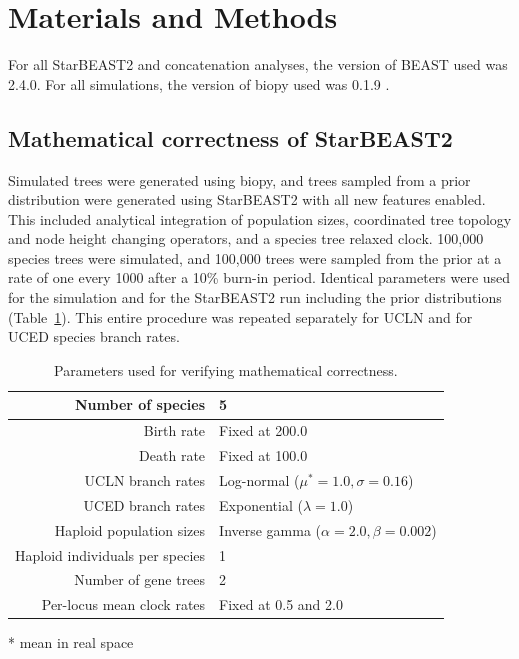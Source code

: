 \documentclass[12pt]{article}
\begin{document}
\section*{Materials and Methods}

For all StarBEAST2 and concatenation analyses, the version of BEAST used was
2.4.0. For all simulations, the version of biopy used was 0.1.9 \citep{biopy}.

\subsection*{Mathematical correctness of StarBEAST2}

Simulated trees were generated using biopy, and trees sampled from a prior
distribution were generated using StarBEAST2 with all new features enabled. This
included analytical integration of population sizes, coordinated tree topology
and node height changing operators, and a species tree relaxed clock. 100,000
species trees were simulated, and 100,000 trees were sampled from the prior at a
rate of one every 1000 after a 10\% burn-in period. Identical parameters were
used for the simulation and for the StarBEAST2 run including the prior
distributions (Table~\ref{tab:correctParameters}). This entire procedure was
repeated separately for UCLN and for UCED species branch rates.

\begin{table}[htb!]
\centering
\caption{Parameters used for verifying mathematical correctness.}
\label{tab:correctParameters}
\begin{threeparttable}
\begin{adjustbox}{center}
\begin{tabular}{|r|l|}
\hline
Number of species & 5\tabularnewline
\hline
Birth rate & Fixed at 200.0\tabularnewline
\hline
Death rate & Fixed at 100.0\tabularnewline
\hline
UCLN branch rates & Log-normal ($\mu^* = 1.0, \sigma = 0.16$)\tabularnewline
\hline
UCED branch rates & Exponential ($\lambda = 1.0$)\tabularnewline
\hline
Haploid population sizes & Inverse gamma ($\alpha = 2.0, \beta = 0.002$)\tabularnewline
\hline
Haploid individuals per species & 1\tabularnewline
\hline
Number of gene trees & 2\tabularnewline
\hline
Per-locus mean clock rates & Fixed at 0.5 and 2.0\tabularnewline
\hline
\end{tabular}
\end{adjustbox}
\begin{tablenotes}
\small
\item \hspace{2cm} * mean in real space
\end{tablenotes}
\end{threeparttable}
\end{table}
\end{document}
